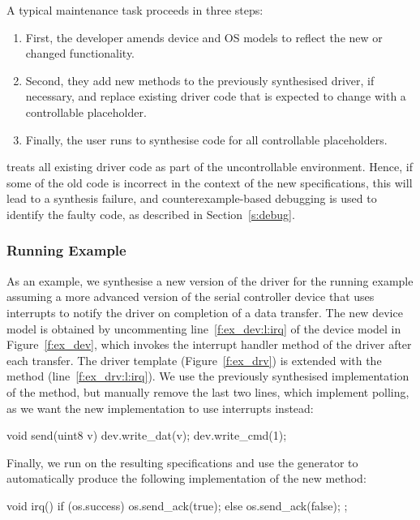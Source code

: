 A typical maintenance task proceeds in three steps:

\begin{enumerate}
    \item First, the developer amends device and OS models to reflect the new or changed functionality.  
    \item Second, they add new methods to the previously synthesised driver, if necessary, and replace existing driver code that is expected to change with a controllable  placeholder.  
    \item Finally, the user runs \termite to synthesise code for all controllable placeholders.  
\end{enumerate}
        
\termite treats all existing driver code as part of the uncontrollable environment.  Hence, if some of the old code is incorrect in the context of the new specifications, this will lead to a synthesis failure, and counterexample-based debugging is used to identify the faulty code, as described in Section~\ref{s:debug}.

\subsubsection{Running Example}

As an example, we synthesise a new version of the driver for the running example assuming a more advanced version of the serial controller device that uses interrupts to notify the driver on completion of a data transfer.  The new device model is obtained by uncommenting line~\ref{f:ex_dev:l:irq} of the device model in Figure~\ref{f:ex_dev}, which invokes the interrupt handler method of the driver after each transfer.  The driver template (Figure~\ref{f:ex_drv}) is extended with the  method (line~\ref{f:ex_drv:l:irq}).  We use the previously synthesised implementation of the  method, but manually remove the last two lines, which implement polling, as we want the new implementation to use interrupts instead:

\begin{tsllisting}
void send(uint8 v){
    dev.write_dat(v);
    dev.write_cmd(1);}
\end{tsllisting}

Finally, we run \termite on the resulting specifications and use the generator to automatically produce the following implementation of the new  method:

\begin{tsllisting}
void irq(){
    if (os.success) {
        os.send_ack(true);
    } else {
        os.send_ack(false);
    };}
\end{tsllisting}


